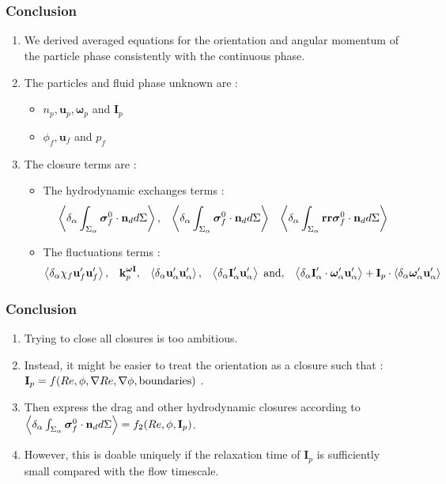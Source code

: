 \documentclass{sintefbeamer}
\begin{document}
\section*{}
\begin{frame}
  \frametitle{Conclusion }
  \begin{enumerate}
    \item We derived averaged equations for the orientation and angular momentum of the particle phase consistently with the continuous phase. 
    \item The particles and fluid phase unknown are :
    \begin{itemize}
      \item $n_p, \textbf{u}_p, \bm\omega_p$ and $\textbf{I}_p$
      \item $\phi_f, \textbf{u}_f$ and $p_f$
    \end{itemize}
    \item The closure terms  are :
    \begin{itemize}
      \item The hydrodynamic exchanges terms : 
      \begin{align*}
        \left<\delta_\alpha \int_{\Sigma_\alpha} \bm{\sigma}_f^0 \cdot \textbf{n}_d d\Sigma\right>,  
        && \left<\delta_\alpha \int_{\Sigma_\alpha} \bm{\sigma}_f^0 \cdot \textbf{n}_d d\Sigma\right>
        && \left<\delta_\alpha \int_{\Sigma_\alpha} \textbf{rr}\bm{\sigma}_f^0 \cdot \textbf{n}_d d\Sigma\right>
      \end{align*}
      \item The fluctuations terms : 
      \begin{align*}
        \left<\delta_\alpha \chi_f \textbf{u}_f' \textbf{u}_f'\right>,
        && \textbf{k}^{\bm\omega \textbf{I}}_p,
        && \left<\delta_\alpha \textbf{u}_\alpha' \textbf{u}_{\alpha}'\right>,
        && \left<\delta_\alpha \textbf{I}_\alpha' \textbf{u}_{\alpha}'\right> \text{ and},
        && \left<\delta_\alpha \textbf{I}'_\alpha\cdot \bm\omega'_\alpha \textbf{u}_\alpha'\right> 
        + \textbf{I}_p \cdot \left<\delta_\alpha \bm\omega_\alpha' \textbf{u}_\alpha'\right>
    \end{align*}
    \end{itemize}

  \end{enumerate}

\end{frame}
\begin{frame}
  \frametitle{Conclusion }
  \begin{enumerate}
    \item Trying to close all closures is too ambitious. 
    \item Instead, it might be easier to treat the orientation as a closure such that : $\textbf{I}_p = f(Re,\phi,\mathbf{\nabla} Re,\mathbf{\nabla} \phi, \text{boundaries})$ . 
    \item Then express the drag and other hydrodynamic closures according to $\left<\delta_\alpha \int_{\Sigma_\alpha} \bm{\sigma}_f^0 \cdot \textbf{n}_d d\Sigma\right> = f_2 (Re,\phi, \textbf{I}_p)$. 
    \item However, this is doable uniquely if the relaxation time of $\textbf{I}_p$ is sufficiently small compared with the flow timescale. 
  \end{enumerate}

\end{frame}
\backmatter
\end{document}
